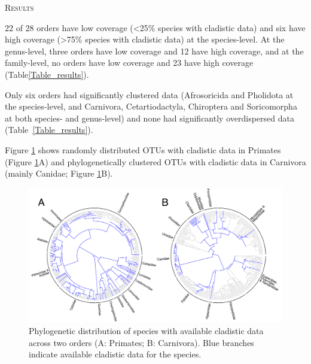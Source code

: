 \documentclass[12pt,letterpaper]{article}
\renewcommand{\section}[1]{%
\bigskip
\begin{center}
\begin{Large}
\normalfont\scshape #1
\medskip
\end{Large}
\end{center}}
\begin{document}
%
%


\section{Results}
22 of 28 orders have low coverage (\textless 25\% species with cladistic data) and six have high coverage (\textgreater 75\% species with cladistic data) at the species-level.
At the genus-level, three orders have low coverage and 12 have high coverage, and at the family-level, no orders have low coverage and 23 have high coverage (Table\ref{Table_results}).




Only six orders had significantly clustered data (Afrosoricida and Pholidota at the species-level, and Carnivora, Cetartiodactyla, Chiroptera and Soricomorpha at both species- and genus-level) and none had significantly overdispersed data (Table~\ref{Table_results}).

Figure \ref{Figure_example_coverage} shows randomly distributed OTUs with cladistic data in Primates (Figure \ref{Figure_example_coverage}A) and phylogenetically clustered OTUs with cladistic data in Carnivora (mainly Canidae; Figure \ref{Figure_example_coverage}B).

\begin{figure}[!htbp]
\centering
    \includegraphics[width=1\textwidth]{example_coverage.pdf}
\caption{Phylogenetic distribution of species with available cladistic data across two orders (A: Primates; B: Carnivora).
Blue branches indicate available cladistic data for the species.}
\label{Figure_example_coverage}
\end{figure}
\end{document}
